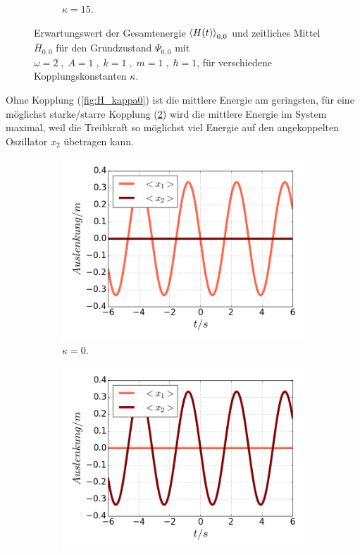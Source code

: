 \begin{figure}
\begin{subfigure}[t]{0.5\textwidth}
          \caption{$\kappa=15$.}
          \label{fig:H_kappa15}
      \end{subfigure}
      \caption{Erwartungswert der Gesamtenergie $\braket{H(t)}_{0,0}$ und zeitliches Mittel $\overline{H}_{0,0}$ für den Grundzustand $\Psi_{0,0}$ mit $\omega=2 \;,\; A=1 \;,\; k=1 \;,\; m=1 \;,\; \hbar=1$, für verschiedene Kopplungskonstanten $\kappa$.}
    \end{figure}
\fi
    Ohne Kopplung (\ref{fig:H_kappa0}) ist die mittlere Energie am geringsten, für eine möglichst starke/starre Kopplung (\ref{fig:H_kappa15}) wird die mittlere Energie im System maximal, weil die Treibkraft so möglichst viel Energie auf den angekoppelten Oszillator $x_2$ übetragen kann.
    \begin{figure}
      \begin{subfigure}[t]{0.5\textwidth}
        \centering
        \includegraphics[width=\textwidth]{plots/<x2>nl0.png}
        \caption{$\kappa=0$.}
        \label{fig:x2_null}
      \end{subfigure}
      \begin{subfigure}[t]{0.5\textwidth}
          \centering
          \includegraphics[width=\textwidth]{plots/<x1>nl0.png}

\end{subfigure}
\end{figure}
